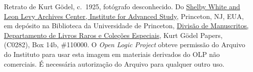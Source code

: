 Retrato de Kurt G\"odel, c.~1925, fotógrafo desconhecido. Do
\href{https://library.ias.edu/archives}{Shelby White and Leon Levy
Archives Center, Institute for Advanced Study}, Princeton, NJ, EUA, em
depósito na Biblioteca da Universidade de Princeton,
\href{http://rbsc.princeton.edu/divisions/manuscripts-division}{Divisão de Manuscritos, Departamento de Livros Raros e Coleções Especiais}, Kurt
G\"odel Papers, (C0282), Box 14b, \#110000. O \emph{Open Logic Project}
obteve permissão do Arquivo do Instituto para usar esta imagem em
materiais derivados do OLP não comerciais.
É necessária autorização do Arquivo para qualquer outro uso.
